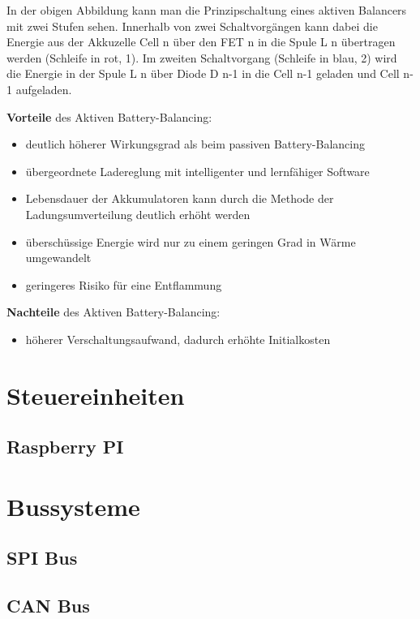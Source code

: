 In der obigen Abbildung kann man die Prinzipschaltung eines aktiven Balancers mit zwei Stufen sehen. Innerhalb von zwei Schaltvorgängen kann dabei die Energie aus der Akkuzelle Cell n über den FET n in die Spule L n übertragen werden (Schleife in rot, 1).
Im zweiten Schaltvorgang (Schleife in blau, 2) wird die Energie in der Spule L n über Diode D n-1 in die Cell n-1 geladen und Cell n-1 aufgeladen.

\textbf{Vorteile} des Aktiven Battery-Balancing:
\begin{itemize}
\item {deutlich höherer Wirkungsgrad als beim passiven Battery-Balancing} \medskip\\
\item {übergeordnete Ladereglung mit intelligenter und lernfähiger Software} \medskip\\
\item {Lebensdauer der Akkumulatoren kann durch die Methode der Ladungsumverteilung deutlich erhöht werden} \medskip\\
\item {überschüssige Energie wird nur zu einem geringen Grad in Wärme umgewandelt} \medskip\\
\item {geringeres Risiko für eine Entflammung} \medskip\\
\end{itemize}

\textbf{Nachteile} des Aktiven Battery-Balancing:
\begin{itemize}
\item {höherer Verschaltungsaufwand, dadurch erhöhte Initialkosten} \medskip\\
\end{itemize}

\section{Steuereinheiten}
\subsection{Raspberry PI}
\section{Bussysteme}
\subsection{SPI Bus}
\subsection{CAN Bus}
